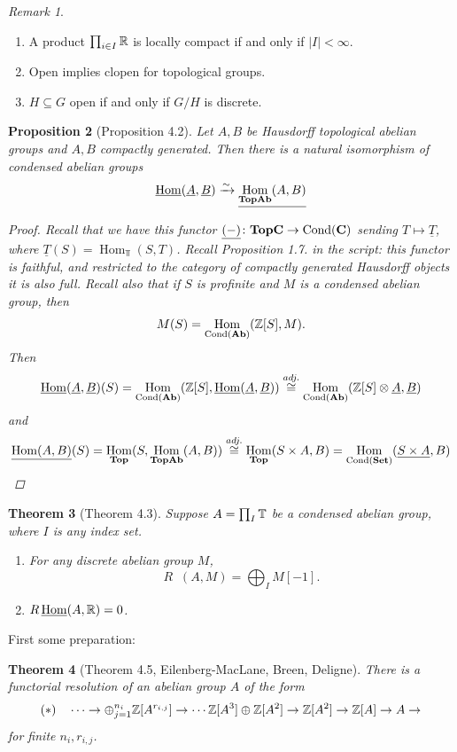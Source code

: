 \documentclass[A4paper, british, reqno]{amsart}
\theoremstyle{darkgreentheorem}
\newtheorem{thm}{Theorem}[section]
\newtheorem{prop}[thm]{Proposition}
\theoremstyle{darkbluedefinition}
\theoremstyle{darkredexample}
\theoremstyle{remark}
\newtheorem{rem}[thm]{Remark}
\DeclareMathOperator{\Hom}{Hom}
\DeclareMathOperator{\Cond}{Cond}
\DeclareMathOperator{\ihom}{\underline{Hom}}
\newcommand{\1}{\mathbbm{1}}
\renewcommand{\u}[1]{\underline{#1}}
\newcommand{\ot}{\otimes}
\newcommand{\op}{\oplus}
\newcommand{\tms}{\times}
\newcommand{\sub}{\subseteq}
\begin{document}
\begin{rem}
    \begin{enumerate}[label=\roman*)]
	\item A product $\prod_{i\in I}\mathbb{R}$ is locally compact if and only if $|I|<\infty$.
	\item Open implies clopen for topological groups.
	\item $H\sub G$ open if and only if $G/H$ is discrete.
    \end{enumerate}
\end{rem}

\begin{prop}[Proposition 4.2]
    Let $A,B$ be Hausdorff topological abelian groups and $A,B$ compactly generated.
    Then there is a natural isomorphism of condensed abelian groups
    \[ \ihom(\u{A},\u{B})\xrightarrow{\sim} \u{\Hom_{\Top\Ab}(A,B)} \]
    \begin{proof}
	Recall that we have this functor $\u{(-)}\colon \Top\bfC\to \Cond(\bfC)$ sending $T\mapsto \u{T}$, where $\u{T}(S)=\Hom_{\Top}(S,T)$.
	Recall Proposition 1.7. in the script: this functor is faithful, and restricted to the category of compactly generated Hausdorff objects it is also full.
	Recall also that if $S$ is profinite and $M$ is a condensed abelian group, then
	\[ M(S)=\Hom_{\Cond(\Ab)}(\Z[S],M). \]
	Then
	\[ \ihom(\u{A},\u{B})(S)=\Hom_{\Cond(\Ab)}(\Z[S],\ihom(\u{A},\u{B}))\overset{adj.}{\cong} \Hom_{\Cond(\Ab)}(\Z[S]\ot \u{A}, \u{B}) \]
	and
	\[ \u{\Hom(A,B)}(S)=\Hom_{\Top}(S,\Hom_{\Top\Ab}(A,B))\overset{adj.}{\cong} \Hom_{\Top}(S\tms A,B)=\Hom_{\Cond(\Set)}(\u{S\tms A},B) \]
    \end{proof}
\end{prop}

\begin{thm}[Theorem 4.3]
    Suppose $A=\prod_{I}\mathbb{T}$ be a condensed abelian group, where $I$ is any index set.
    \begin{enumerate}[label=\roman*)]
	\item For any discrete abelian group $M$,
	    \[ R\ihom(A,M)=\bigoplus_{I}M[-1]. \]
	\item $R\ihom(A,\R)=0$.
    \end{enumerate}
\end{thm}

First some preparation:

\begin{thm}[Theorem 4.5, Eilenberg-MacLane, Breen, Deligne]
    There is a functorial resolution of an abelian group $A$ of the form
    \[ (*)\quad \cdots \to \op_{j=1}^{n_{i}}\Z[A^{r_{{i,j}}}]\to \cdots \Z[A^{3}]\op \Z[A^{2}]\to \Z[A^{2}]\to \Z[A]\to A\to \]
    for finite $n_{i},r_{i,j}$.
\end{thm}
\end{document}
